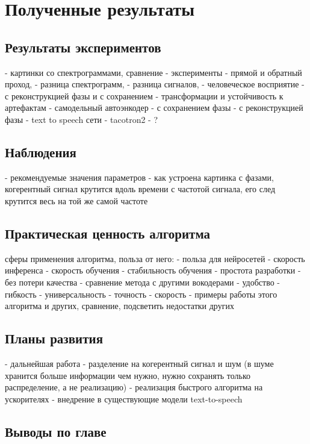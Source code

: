 \chapter{Полученные результаты}

\section{Результаты экспериментов}
  - картинки со спектрограммами, сравнение
  - эксперименты
   - прямой и обратный проход, 
     - разница спектрограмм, 
     - разница сигналов, 
     - человеческое восприятие
     - с реконструкцией фазы и с сохранением
     - трансформации и устойчивость к артефактам
   - самодельный автоэнкодер 
     - с сохранением фазы
	 - с реконструкцией фазы
   - text to speech сети
     - tacotron2
	 - ?

\section{Наблюдения}
  - рекомендуемые значения параметров
  - как устроена картинка с фазами, когерентный сигнал крутится вдоль времени с частотой сигнала, его след крутится весь на той же самой частоте

\section{Практическая ценность алгоритма}
   сферы применения алгоритма, польза от него:
    - польза для нейросетей
      - скорость инференса
      - скорость обучения
      - стабильность обучения
      - простота разработки
      - без потери качества
  - сравнение метода с другими вокодерами
    - удобство
    - гибкость
    - универсальность
    - точность
    - скорость
  - примеры работы этого алгоритма и других, сравнение, подсветить недостатки других

\section{Планы развития}
 - дальнейшая работа
   - разделение на когерентный сигнал и шум (в шуме хранится больше информации чем нужно, нужно сохранять только распределение, а не реализацию)
   - реализация быстрого алгоритма на ускорителях
   - внедрение в существующие модели text-to-speech

\section{Выводы по главе}